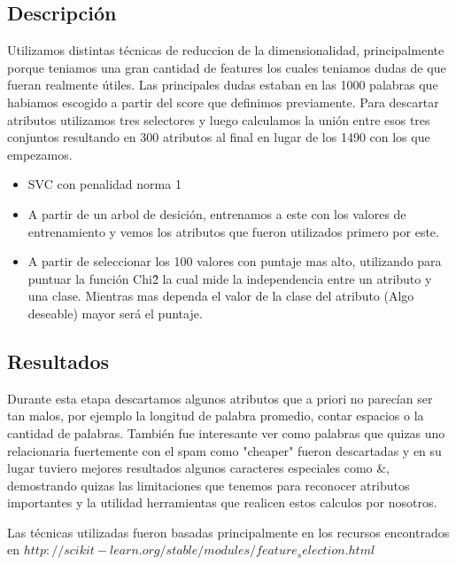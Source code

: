 \subsection{Descripción}

Utilizamos distintas técnicas de reduccion de la dimensionalidad, principalmente porque teniamos una gran cantidad de features los cuales teniamos dudas de que fueran realmente útiles. Las principales dudas estaban en las 1000 palabras que habiamos escogido a partir del score que definimos previamente. Para descartar atributos utilizamos tres selectores y luego calculamos la unión entre esos tres conjuntos resultando en 300 atributos al final en lugar de los 1490 con los que empezamos.
\begin{itemize}

\item SVC con penalidad norma 1

\item A partir de un arbol de desición, entrenamos a este con los valores de entrenamiento y vemos los atributos que fueron utilizados primero por este.

\item A partir de seleccionar los 100 valores con puntaje mas alto, utilizando para puntuar la función Chi\^2 la cual mide la independencia entre un atributo y una clase. Mientras mas dependa el valor de la clase del atributo (Algo deseable) mayor será el puntaje.

\end{itemize}

\subsection{Resultados}

Durante esta etapa descartamos algunos atributos que a priori no parecían ser tan malos, por ejemplo la longitud de palabra promedio, contar espacios o la cantidad de palabras. También fue interesante ver como palabras que quizas uno relacionaria fuertemente con el spam como "cheaper" fueron descartadas y en su lugar tuviero mejores resultados algunos caracteres especiales como \&, demostrando quizas las limitaciones que tenemos para reconocer atributos importantes y la utilidad herramientas que realicen estos calculos por nosotros.

Las técnicas utilizadas fueron basadas principalmente en los recursos encontrados en $http://scikit-learn.org/stable/modules/feature_selection.html$